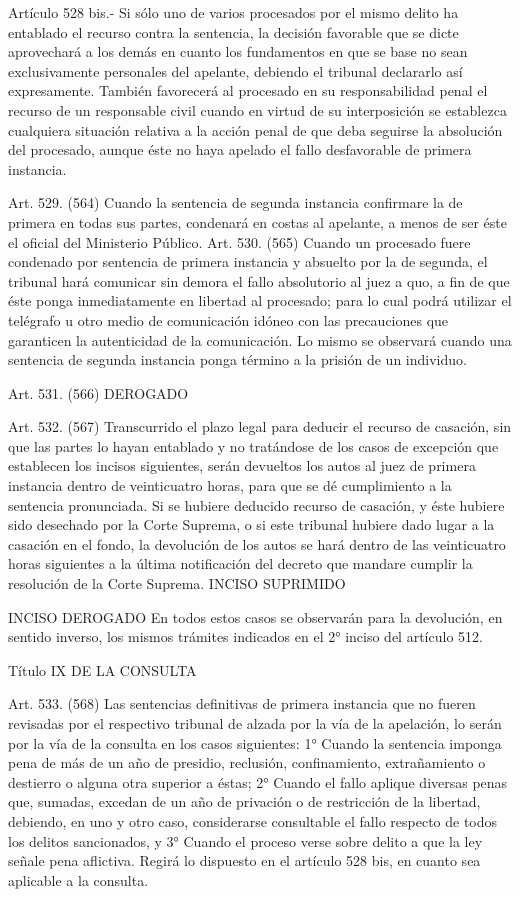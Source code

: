     Artículo 528 bis.- Si sólo uno de varios procesados por el mismo delito ha entablado el recurso contra la sentencia, la decisión favorable que se dicte aprovechará a los demás en cuanto los fundamentos en que se base no sean exclusivamente personales del apelante, debiendo el tribunal declararlo así expresamente.
    También favorecerá al procesado en su responsabilidad penal el recurso de un responsable civil cuando en virtud de su interposición se establezca cualquiera situación relativa a la acción penal de que deba  seguirse la absolución del procesado, aunque éste no haya apelado el fallo desfavorable de primera instancia.



    Art. 529. (564) Cuando la sentencia de segunda instancia confirmare la de primera en todas sus partes, condenará en costas al apelante, a menos de ser éste el oficial del Ministerio Público.
    Art. 530. (565) Cuando un procesado fuere condenado por sentencia de primera instancia y absuelto por la de segunda, el tribunal hará comunicar sin demora el fallo absolutorio al juez a quo, a fin de que éste ponga inmediatamente en libertad al procesado; para lo cual podrá utilizar el telégrafo u otro medio de comunicación idóneo con las precauciones que garanticen la autenticidad de la comunicación.
    Lo mismo se observará cuando una sentencia de segunda instancia ponga término a la prisión de un individuo.

    Art. 531. (566) DEROGADO

    Art. 532. (567) Transcurrido el plazo legal para deducir el recurso de casación, sin que las partes lo hayan entablado y no tratándose de los casos de excepción que establecen los incisos siguientes, serán devueltos los autos al juez de primera instancia dentro de veinticuatro horas, para que se dé cumplimiento a la sentencia pronunciada.
    Si se hubiere deducido recurso de casación, y éste hubiere sido desechado por la Corte Suprema, o si este tribunal hubiere dado lugar a la casación en el fondo, la devolución de los autos se hará dentro de las veinticuatro horas siguientes a la última notificación del decreto que mandare cumplir la resolución de la Corte Suprema.
    INCISO SUPRIMIDO

    INCISO DEROGADO
En todos estos casos se observarán para la devolución, en sentido inverso, los mismos trámites indicados en el 2° inciso del artículo 512.

    Título IX
    DE LA CONSULTA

    Art. 533. (568) Las sentencias definitivas de primera instancia que no fueren revisadas por el respectivo tribunal de alzada por la vía de la apelación, lo serán por la vía de la consulta en los casos siguientes:
    1° Cuando la sentencia imponga pena de más de un año de presidio, reclusión, confinamiento, extrañamiento o destierro o alguna otra superior a éstas;
    2° Cuando el fallo aplique diversas penas que, sumadas, excedan de un año de privación o de restricción de la libertad, debiendo, en uno y otro caso, considerarse consultable el fallo respecto de todos los delitos sancionados, y
    3° Cuando el proceso verse sobre delito a que la ley señale pena aflictiva.
    Regirá lo dispuesto en el artículo 528 bis, en cuanto sea aplicable a la consulta.


